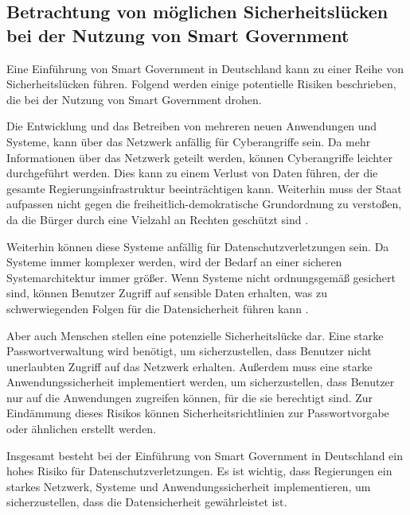 \subsection{Betrachtung von möglichen Sicherheitslücken bei der Nutzung von Smart Government}
Eine Einführung von Smart Government in Deutschland kann zu einer Reihe von Sicherheitslücken führen.
Folgend werden einige potentielle Risiken beschrieben, die bei der Nutzung von Smart Government drohen.
\par
Die Entwicklung und das Betreiben von mehreren neuen Anwendungen und Systeme, kann über das Netzwerk anfällig für Cyberangriffe sein.
Da mehr Informationen über das Netzwerk geteilt werden, können Cyberangriffe leichter durchgeführt werden.
Dies kann zu einem Verlust von Daten führen, der die gesamte Regierungsinfrastruktur beeinträchtigen kann.
Weiterhin muss der Staat aufpassen nicht gegen die freiheitlich-demokratische Grundordnung zu verstoßen, da die Bürger durch eine Vielzahl an Rechten geschützt sind \citep[Vgl.][S. 179]{von_Lucke_2016}.
\par
Weiterhin können diese Systeme anfällig für Datenschutzverletzungen sein.
Da Systeme immer komplexer werden, wird der Bedarf an einer sicheren Systemarchitektur immer größer.
Wenn Systeme nicht ordnungsgemäß gesichert sind, können Benutzer Zugriff auf sensible Daten erhalten, was zu schwerwiegenden Folgen für die Datensicherheit führen kann \citep[Vgl.][]{von_Lucke_2016}.
\par
Aber auch Menschen stellen eine potenzielle Sicherheitslücke dar.
Eine starke Passwortverwaltung wird benötigt, um sicherzustellen, dass Benutzer nicht unerlaubten Zugriff auf das Netzwerk erhalten.
Außerdem muss eine starke Anwendungssicherheit implementiert werden, um sicherzustellen, dass Benutzer nur auf die Anwendungen zugreifen können, für die sie berechtigt sind.
Zur Eindämmung dieses Risikos können Sicherheitsrichtlinien zur Passwortvorgabe oder ähnlichen erstellt werden.
\par
Insgesamt besteht bei der Einführung von Smart Government in Deutschland ein hohes Risiko für Datenschutzverletzungen.
Es ist wichtig, dass Regierungen ein starkes Netzwerk, Systeme und Anwendungssicherheit implementieren, um sicherzustellen, dass die Datensicherheit gewährleistet ist.
